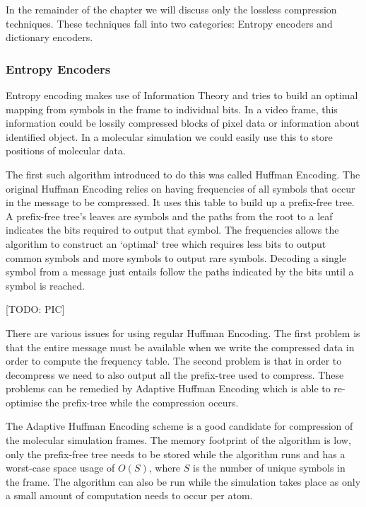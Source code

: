 \documentclass[a4paper,11pt]{report}
\begin{document}
In the remainder of the chapter we will discuss only the lossless compression techniques. These techniques fall into two categories: Entropy encoders and dictionary encoders. 


\subsubsection*{Entropy Encoders}

Entropy encoding makes use of Information Theory and tries to build an optimal mapping from symbols in the frame to individual bits. In a video frame, this information could be lossily compressed blocks of pixel data or information about identified object. In a molecular simulation we could easily use this to store positions of molecular data.

The first such algorithm introduced to do this was called Huffman Encoding\cite{citeulike:1320251}. The original Huffman Encoding relies on having frequencies of all symbols that occur in the message to be compressed. It uses this table to build up a prefix-free tree. A prefix-free tree's leaves are symbols and the paths from the root to a leaf indicates the bits required to output that symbol. The frequencies allows the algorithm to construct an `optimal` tree which requires less bits to output common symbols and more symbols to output rare symbols. Decoding a single symbol from a message just entails follow the paths indicated by the bits until a symbol is reached.

[TODO: PIC]

There are various issues for using regular Huffman Encoding. The first problem is that the entire message must be available when we write the compressed data in order to compute the frequency table.\cite{RefWorks:1} The second problem is that in order to decompress we need to also output all the prefix-tree used to compress. These problems can be remedied by Adaptive Huffman Encoding which is able to re-optimise the prefix-tree while the compression occurs. \cite{42227}

The Adaptive Huffman Encoding scheme is a good candidate for compression of the molecular simulation frames. The memory footprint of the algorithm is low, only the prefix-free tree needs to be stored while the algorithm runs and has a worst-case space usage of $O(S)$, where $S$ is the number of unique symbols in the frame. The algorithm can also be run while the simulation takes place as only a small amount of computation needs to occur per atom.
\end{document}
